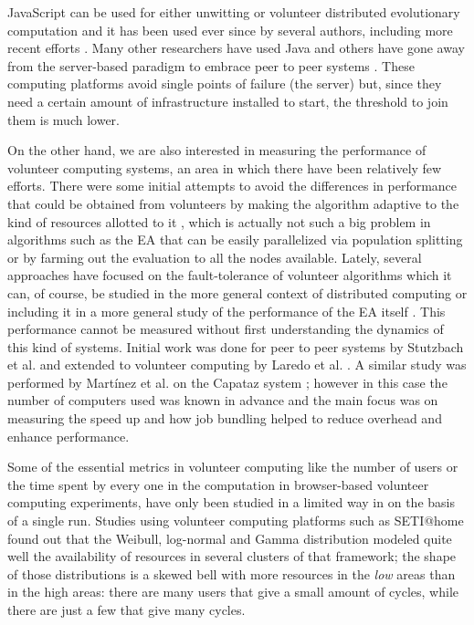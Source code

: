 \documentclass[letterpaper]{article}
\begin{document}
JavaScript can be used for either unwitting
\citep{unwitting-ec,boldrin2007distributed} or volunteer 
\citep{langdon:2005:metas,gecco07:workshop:dcor} distributed
evolutionary computation and it has been used ever since by several
authors, including more recent efforts
\citep{Desell:2008:AHG:1389095.1389273,duda2013distributed,DBLP:journals/corr/abs-0801-1210}. Many other researchers have
used Java \citep{chong:1999:jDGPi} and others have gone away from the
server-based paradigm to embrace peer to peer systems
\citep{jin2006constructing,10.1109/ICICSE.2008.99,DBLP:conf/3pgcic/GuervosMFEL12}. These computing
platforms avoid single points of failure (the server) but, since they
need a certain amount of infrastructure installed to start, the
threshold to join them is much lower.


On the other hand, we are also interested in measuring the performance
of volunteer computing systems, an area in which there have been
relatively few efforts.
There were some initial attempts to avoid the differences in performance
that could be obtained from volunteers  by making
the algorithm adaptive to the kind of resources allotted to it
\citep{milani2004online}, which is actually not such a big problem in
algorithms such as the EA that can be easily 
parallelized via population splitting or by farming out the evaluation to all
the nodes available. Lately, several approaches have focused on the
fault-tolerance of volunteer algorithms %
\citep{gonzalez2010characterizing} which it can, of course, be studied in
the more general context of distributed computing 
\citep{nogueras2015studying} or including it in a more general study of the
performance of the EA itself
\citep{DBLP:journals/gpem/LaredoBGVAGF14}. This performance cannot be
measured without first understanding the dynamics of this kind of systems. Initial
work was done for peer to peer systems by Stutzbach et
al. \citep{stutzbach2006understanding} and extended to volunteer
computing by Laredo et al. \citep{churn08,laredo2008rcp}. A similar
study was performed by Martínez et al. on the Capataz system
\citep{martinez2015capataz}; however in this case the number of
computers used was known in advance and the main focus was on
measuring the speed up and how job bundling helped to reduce overhead and
enhance performance. 

Some of the essential metrics in volunteer computing like the
number of users or the time spent by every one in the
computation in browser-based volunteer computing experiments, have
only been studied in a limited way in 
\citep{DBLP:journals/gpem/LaredoBGVAGF14} on the basis of a single
run. Studies using volunteer computing platforms such as SETI@home
\citep{javadi2009mining,agajaj} found out that the Weibull, log-normal and
Gamma distribution 
modeled quite well the availability of resources in several clusters
of that framework; the shape of those distributions is a skewed bell
with more resources in the {\em low} areas than in the high areas:
there are many users that give a small amount of cycles, while there
are just a few that give many cycles. 
\end{document}
